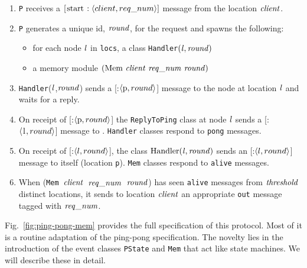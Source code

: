 \documentclass[final]{article}
\newcommand{\listinline}[1]{\text{\lstinline{#1}}}
\newcommand{\MSG}[2]{[\listinline{#1}:#2]}
\begin{document}
\begin{enumerate}
\item
\lstinline{P} receives a $\MSG{start}{\NUPRLpair{client}{req\_num}}$
message from the location $\mathit{client}$.

\item\label{P-PState-Round}
\lstinline{P} generates a unique id, $\mathit{round}$, for the request
and spawns the following:
  \begin{itemize}
  \item
  for each node $\mathit{l}$ in \lstinline{locs}, a class
  \lstinline{Handler}$(\mathit{l},\mathit{round})$
  \item
  a memory module
  $(\listinline{Mem}~\NUPRL{client}~\NUPRL{req\_num}~\NUPRL{round})$
  \end{itemize}

\item\label{handler-m-ping}
\lstinline{Handler}($\mathit{l}$,$\mathit{round}$) sends a
\MSG{ping}{$\NUPRLpair{\listinline{p}}{round}$} message to the
node at location $\mathit{l}$ and waits for a reply.

\item
On receipt of \MSG{ping}{$\NUPRLpair{\listinline{p}}{round}$} the
  \lstinline{ReplyToPing} class at node $\mathit{l}$ sends a
  \MSG{pong}{$\NUPRLpair{\listinline{l}}{round}$} message to
    \listinline{p}.  \lstinline{Handler} classes respond to
    \lstinline{pong} messages.

\item\label{handler-m-alive}
On receipt of
\MSG{pong}{$\langle l,round\rangle$}, the class
$\listinline{Handler}(\NUPRL{l},\NUPRL{round})$ sends an
\MSG{alive}{$\langle l,round\rangle$} message to
itself (location \lstinline{p}).  \lstinline{Mem} classes respond to
\lstinline{alive} messages.

\item
When
(\lstinline{Mem}~$\mathit{client}$~$\mathit{req\_num}$~$\mathit{round}$)
has seen \lstinline{alive} messages from
$\mathit{threshold}$ distinct locations, it sends to location
$\mathit{client}$ an appropriate \lstinline{out} message tagged with
$\mathit{req\_num}$.

\end{enumerate}
Fig.~\ref{fig:ping-pong-mem} provides the full specification of this
protocol.  Most of it is a routine adaptation of the ping-pong
specification.  The novelty lies in the introduction of the event
classes \lstinline{PState} and \lstinline{Mem} that act like state
machines.  We will describe these in detail.
\end{document}
